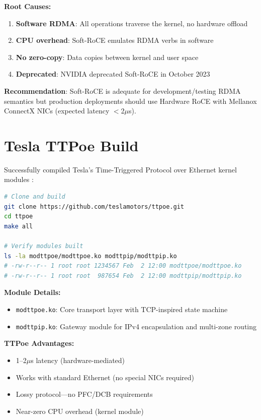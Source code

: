 \documentclass[10pt,letterpaper]{article}
\begin{document}
\textbf{Root Causes:}
\begin{enumerate}[noitemsep]
    \item \textbf{Software RDMA}: All operations traverse the kernel, no hardware offload
    \item \textbf{CPU overhead}: Soft-RoCE emulates RDMA verbs in software
    \item \textbf{No zero-copy}: Data copies between kernel and user space
    \item \textbf{Deprecated}: NVIDIA deprecated Soft-RoCE in October 2023
\end{enumerate}

\textbf{Recommendation}: Soft-RoCE is adequate for development/testing RDMA semantics but production deployments should use Hardware RoCE with Mellanox ConnectX NICs \cite{mofed-docs} (expected latency $<$2$\mu$s).

\section{Tesla TTPoe Build}

Successfully compiled Tesla's Time-Triggered Protocol over Ethernet kernel modules \cite{ttpoe-repo,ttpoe-hotchips}:

\begin{lstlisting}[language=bash]
# Clone and build
git clone https://github.com/teslamotors/ttpoe.git
cd ttpoe
make all

# Verify modules built
ls -la modttpoe/modttpoe.ko modttpip/modttpip.ko
# -rw-r--r-- 1 root root 1234567 Feb  2 12:00 modttpoe/modttpoe.ko
# -rw-r--r-- 1 root root  987654 Feb  2 12:00 modttpip/modttpip.ko
\end{lstlisting}

\textbf{Module Details:}
\begin{itemize}[noitemsep]
    \item \texttt{modttpoe.ko}: Core transport layer with TCP-inspired state machine
    \item \texttt{modttpip.ko}: Gateway module for IPv4 encapsulation and multi-zone routing
\end{itemize}

\textbf{TTPoe Advantages:}
\begin{itemize}[noitemsep]
    \item 1--2$\mu$s latency (hardware-mediated)
    \item Works with standard Ethernet (no special NICs required)
    \item Lossy protocol---no PFC/DCB requirements
    \item Near-zero CPU overhead (kernel module)
\end{itemize}
\end{document}
